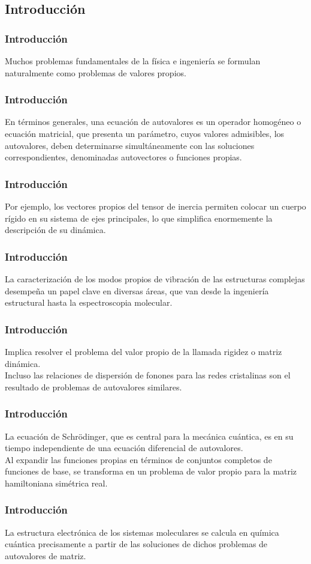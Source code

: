 \subsection{Introducción}
\begin{frame}
\frametitle{Introducción}
Muchos problemas fundamentales de la física e ingeniería se formulan naturalmente como problemas de valores propios. 
\end{frame}
\begin{frame}
\frametitle{Introducción}
En términos generales, una ecuación de autovalores es un operador homogéneo o ecuación matricial, que presenta un parámetro, cuyos valores admisibles, los autovalores, deben determinarse simultáneamente con las soluciones correspondientes, denominadas autovectores o funciones propias.
\end{frame}
\begin{frame}
\frametitle{Introducción}
Por ejemplo, los vectores propios del tensor de inercia permiten colocar un cuerpo rígido en su sistema de ejes principales, lo que simplifica enormemente la descripción de su dinámica.
\end{frame}
\begin{frame}
\frametitle{Introducción}
La caracterización de los modos propios de vibración de las estructuras complejas desempeña un papel clave en diversas áreas, que van desde la ingeniería estructural hasta la espectroscopia molecular.
\end{frame}
\begin{frame}
\frametitle{Introducción}
Implica resolver el problema del valor propio de la llamada rigidez o matriz dinámica.
\\
\bigskip
Incluso las relaciones de dispersión de fonones para las redes cristalinas son el resultado de problemas de autovalores similares.
\end{frame}
\begin{frame}
\frametitle{Introducción}
La ecuación de Schrödinger, que es central para la mecánica cuántica, es en su tiempo independiente de una ecuación diferencial de autovalores. 
\\
\bigskip
Al expandir las funciones propias en términos de conjuntos completos de funciones de base, se transforma en un problema de valor propio para la matriz hamiltoniana simétrica real. 
\end{frame}
\begin{frame}
\frametitle{Introducción}
La estructura electrónica de los sistemas moleculares se calcula en química cuántica precisamente a partir de las soluciones de dichos problemas de autovalores de matriz.
\end{frame}

